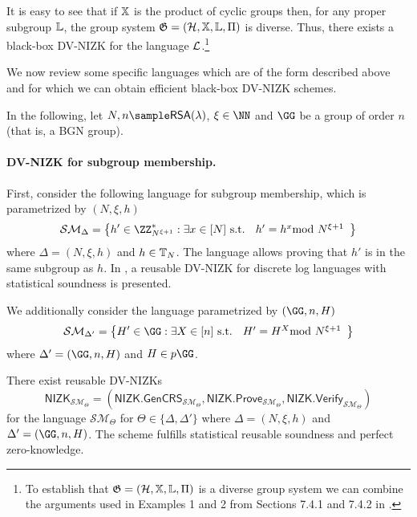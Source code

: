 It is easy to see that if $\mathbb{X}$ is the product of cyclic groups then, for any proper subgroup $\mathbb{L}$, the group system $\mathfrak{G}=(\mathcal{H},\mathbb{X},\mathbb{L},\Pi)$ is diverse. Thus, there exists a black-box DV-NIZK for the language $\mathcal{L}$.\footnote{To establish that $\mathfrak{G}=(\mathcal{H},\mathbb{X},\mathbb{L},\Pi)$ is a diverse group system we can combine the arguments used in Examples 1 and 2 from Sections 7.4.1 and 7.4.2 in \cite{EC:CraSho02}.}



We now review some specific languages which are of the form described above and for which we can obtain efficient black-box DV-NIZK schemes. 


In the following, let $N,n\sample \mathsf{RSA}(\lambda)$, $\xi\in\NN$ and $\GG$ be a group of order $n$ (that is, a BGN group).

\paragraph{DV-NIZK for subgroup membership.} First, consider the following language for subgroup membership, which is parametrized by $(N,\xi,h)$  $${\mathcal{SM}_\Delta}=\left\{h'\in\ZZ^\ast_{N^{\xi+1}}:\exists x\in [N] \text{ s.t. } \begin{array}{c}
     h'=h^{x}\smod N^{\xi+1}
 \end{array} \right\}$$ where $\Delta=(N,\xi,h)$ and $h\in\mathbb{T}_N$. The language allows proving that  $h'$ is in the same subgroup as $h$. In \cite{EC:CraSho02}, a reusable DV-NIZK for discrete log languages with statistical soundness is presented. 
 
 We additionally consider the language parametrized by $(\GG,n,H)$  $${\mathcal{SM}_{\Delta'}}=\left\{H'\in\GG:\exists X\in [n] \text{ s.t. } \begin{array}{c}
     H'=H^{X}\smod N^{\xi+1}
 \end{array} \right\}$$ where $\Delta'=(\GG,n,H)$ and $H\in p\GG$.
 
 
 \begin{lemma}
\label{lemma:DL}
There exist reusable DV-NIZKs $$\mathsf{NIZK}_{\mathcal{SM}_\Theta}=(\mathsf{NIZK.GenCRS}_{\mathcal{SM}_\Theta},\mathsf{NIZK.Prove}_{\mathcal{SM}_\Theta},\mathsf{NIZK.Verify}_{\mathcal{SM}_\Theta})$$ for the language ${\mathcal{SM}_\Theta}$ for $\Theta\in \{\Delta,\Delta'\}$ where $\Delta=(N,\xi,h)$ and $\Delta'=(\GG,n,H)$. The scheme fulfills statistical reusable soundness and perfect zero-knowledge.
\end{lemma}



